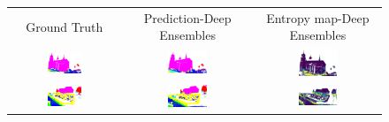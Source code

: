     \begin{figure}[h!]
        \begin{tabular}{ccc}
            Ground Truth & Prediction-Deep Ensembles & Entropy map-Deep Ensembles \\
            \includegraphics[width=0.33\textwidth, height=0.18\textheight]{images/seg_output/sem3d_seg_output/1_GT.png} &
            \includegraphics[width=0.33\textwidth, height=0.18\textheight]{images/seg_output/sem3d_seg_output/1_Pred.png}& 
            \includegraphics[width=0.33\textwidth, height=0.18\textheight]{images/seg_output/sem3d_seg_output/ent_de_1.png}\\

            \includegraphics[width=0.33\textwidth, height=0.18\textheight]{images/seg_output/sem3d_seg_output/2_GT.png} &
            \includegraphics[width=0.33\textwidth, height=0.18\textheight]{images/seg_output/sem3d_seg_output/2_Pred.png}& 
            \includegraphics[width=0.33\textwidth, height=0.18\textheight]{images/seg_output/sem3d_seg_output/ent_de_2.png}\\


\end{tabular}
\end{figure}
